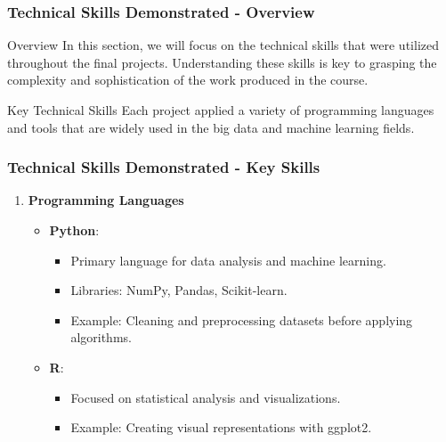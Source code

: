 \documentclass[aspectratio=169]{beamer}
\begin{document}
\begin{frame}[fragile]
  \frametitle{Technical Skills Demonstrated - Overview}
  \begin{block}{Overview}
    In this section, we will focus on the technical skills that were utilized throughout the final projects. Understanding these skills is key to grasping the complexity and sophistication of the work produced in the course.
  \end{block}
  \begin{block}{Key Technical Skills}
    Each project applied a variety of programming languages and tools that are widely used in the big data and machine learning fields.
  \end{block}
\end{frame}

\begin{frame}[fragile]
  \frametitle{Technical Skills Demonstrated - Key Skills}
  \begin{enumerate}
    \item \textbf{Programming Languages}
    \begin{itemize}
      \item \textbf{Python}:
      \begin{itemize}
        \item Primary language for data analysis and machine learning.
        \item Libraries: NumPy, Pandas, Scikit-learn.
        \item Example: Cleaning and preprocessing datasets before applying algorithms.
      \end{itemize}
      \item \textbf{R}:
      \begin{itemize}
        \item Focused on statistical analysis and visualizations.
        \item Example: Creating visual representations with ggplot2.
      \end{itemize}
    \end{itemize}
  \end{enumerate}
\end{frame}
\end{document}
